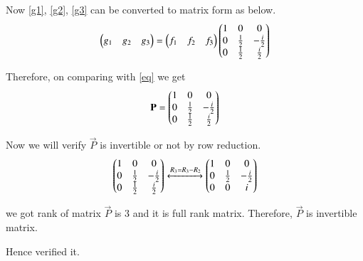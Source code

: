 \documentclass[journal,12pt,twocolumn]{IEEEtran}
\begin{document}
\begin{enumerate}
Now \eqref{g1}, \eqref{g2}, \eqref{g3} can be converted to matrix form as below.
\begin{align}
    \begin{pmatrix}g_1&g_2&g_3\end{pmatrix}=\begin{pmatrix}f_1&f_2&f_3\end{pmatrix}\begin{pmatrix}1&0&0\\0&\frac{1}{2}&-\frac{i}{2}\\0&\frac{1}{2}&\frac{i}{2}\end{pmatrix}
\end{align}

Therefore, on comparing with \eqref{eq} we get
\begin{align}
    \mathbf{P}=\begin{pmatrix}1&0&0\\0&\frac{1}{2}&-\frac{i}{2}\\0&\frac{1}{2}&\frac{i}{2}\end{pmatrix}
\end{align}

Now we will verify $\Vec{P}$ is invertible or not by row reduction.
\begin{align}
    \begin{pmatrix}1&0&0\\0&\frac{1}{2}&-\frac{i}{2}\\0&\frac{1}{2}&\frac{i}{2}\end{pmatrix}\xleftrightarrow{R_3=R_3-R_2}\begin{pmatrix}1&0&0\\0&\frac{1}{2}&-\frac{i}{2}\\0&0&i\end{pmatrix}
\end{align}

we got rank of matrix $\vec{P}$ is 3 and it is full rank matrix. Therefore, $\vec{P}$ is invertible matrix.

Hence verified it.
\end{enumerate}
\end{document}
